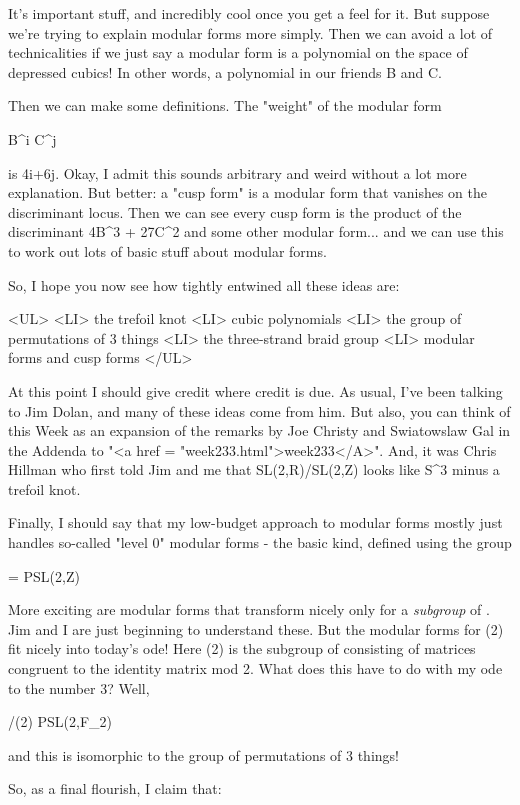 It's important stuff, and incredibly cool once you get a feel for it.
But suppose we're trying to explain modular forms more simply.
Then we can avoid a lot of technicalities if we just say 
a modular form is a polynomial on the space of depressed cubics!  In 
other words, a polynomial in our friends B and C.  

Then we can make some definitions.  The "weight" of the modular form

B^{i} C^{j}

is 4i+6j.  Okay, I admit this sounds arbitrary and weird without a lot
more explanation.  But better: a "cusp form" is a modular
form that vanishes on the discriminant locus.  Then we can see every
cusp form is the product of the discriminant 4B^{3} +
27C^{2} and some other modular form... and we can use this to
work out lots of basic stuff about modular forms.

So, I hope you now see how tightly entwined all these ideas are:

<UL>
<LI>
  the trefoil knot
<LI>
  cubic polynomials
<LI>
  the group of permutations of 3 things
<LI>
  the three-strand braid group
<LI>
  modular forms and cusp forms
</UL>

At this point I should give credit where credit is due.  As usual,
I've been talking to Jim Dolan, and many of these ideas come from
him.  But also, you can think of this Week as an expansion of the
remarks by Joe Christy and Swiatowslaw Gal in the Addenda to 
"<a href = "week233.html">week233</A>".  And, it was
Chris Hillman who first told Jim and me that SL(2,R)/SL(2,Z) looks
like S^{3} minus a trefoil knot.

Finally, I should say that my low-budget approach to modular forms
mostly just handles so-called "level 0" modular forms - the basic 
kind, defined using the group 

\Gamma  = PSL(2,Z)

More exciting are modular forms that transform nicely only for a 
\emph{subgroup} of \Gamma .   Jim and I are just beginning to understand
these.  But the modular forms for \Gamma (2) fit nicely into today's 
ode!  Here \Gamma (2) is the subgroup of \Gamma  consisting of matrices
congruent to the identity matrix mod 2.  What does this have to do
with my ode to the number 3?  Well,

\Gamma /\Gamma (2) \cong  PSL(2,F_{2}) 

and this is isomorphic to the group of permutations of 3 things! 

So, as a final flourish, I claim that:

